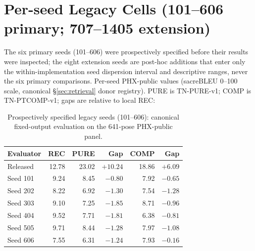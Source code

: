 \documentclass[pdflatex,sn-chicago]{sn-jnl}
\begin{document}
\section{Per-seed Legacy Cells (101--606 primary; 707--1405 extension)}
\label{sec:appendix_extension_cells}
The six primary seeds (101--606) were prospectively specified before their results were inspected; the eight extension seeds are post-hoc additions that enter only the within-implementation seed dispersion interval and descriptive ranges, never the six primary comparisons. Per-seed PHX-public values (sacreBLEU 0--100 scale, canonical \S\ref{sec:retrieval} donor registry). PURE is TN-PURE-v1; COMP is TN-PTCOMP-v1; gaps are relative to local REC:

\begin{table}[h]
\centering
\scriptsize
\caption{Prospectively specified legacy seeds (101--606): canonical fixed-output evaluation on the 641-pose PHX-public panel.}
\label{tab:primary_cells}
\begin{tabular}{lrrrrr}
\toprule
Evaluator & REC & PURE & Gap & COMP & Gap \\
\midrule
Released & 12.78 & 23.02 & $\mathbf{+10.24}$ & 18.86 & $+6.09$ \\
Seed 101 & 9.24 & 8.45 & $-0.80$ & 7.92 & $-0.65$ \\
Seed 202 & 8.22 & 6.92 & $-1.30$ & 7.54 & $-1.28$ \\
Seed 303 & 9.10 & 7.25 & $-1.85$ & 8.71 & $-0.96$ \\
Seed 404 & 9.52 & 7.71 & $-1.81$ & 6.38 & $-0.81$ \\
Seed 505 & 9.71 & 8.44 & $-1.28$ & 7.97 & $-1.08$ \\
Seed 606 & 7.55 & 6.31 & $-1.24$ & 7.93 & $-0.16$ \\
\bottomrule
\end{tabular}
\end{table}
\end{document}
